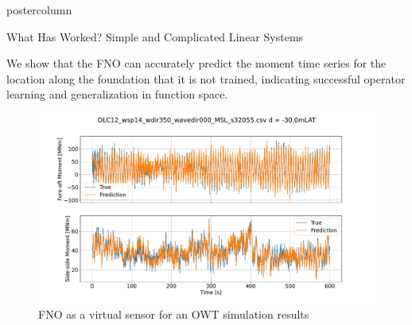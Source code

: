 \documentclass[mathserif]{beamer}
\begin{document}
\begin{frame}
\begin{columns}
\begin{beamercolorbox}[center,wd=\textwidth]{postercolumn}
\begin{minipage}[T]{.95\linewidth}
{\begin{block}{What Has Worked? Simple and Complicated Linear Systems}

We show that the FNO can accurately predict the moment time series for the location along the foundation that it is not trained, indicating successful operator learning and generalization in function space.



     \begin{figure}
         \centering
         \includegraphics[trim={0 0 0 2cm},clip,width=0.6\linewidth]{figures/0000_DLC12_wsp14_wdir350_wavedir000_MSL_s32055.csv_0.0.pdf}
         \caption{FNO as a virtual sensor for an OWT simulation results}
     \end{figure}





 \end{block}


}
\end{minipage}
\end{beamercolorbox}
\end{columns}
\end{frame}
\end{document}
